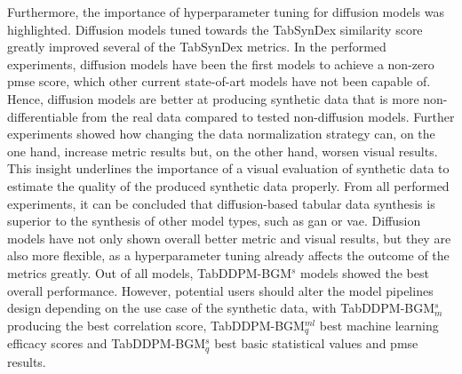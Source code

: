 Furthermore, the importance of hyperparameter tuning for diffusion models was highlighted.
Diffusion models tuned towards the TabSynDex similarity score greatly improved several of the TabSynDex metrics.
In the performed experiments, diffusion models have been the first models to achieve a non-zero \gls{pmse} score, which other current state-of-art models have not been capable of.
Hence, diffusion models are better at producing synthetic data that is more non-differentiable from the real data \cite{chundawat2022UniversalMetricRobust} compared to tested non-diffusion models.
Further experiments showed how changing the data normalization strategy can, on the one hand, increase metric results but, on the other hand, worsen visual results.
This insight underlines the importance of a visual evaluation of synthetic data to estimate the quality of the produced synthetic data properly.
From all performed experiments, it can be concluded that diffusion-based tabular data synthesis is superior to the synthesis of other model types, such as \gls{gan} or \gls{vae}.
Diffusion models have not only shown overall better metric and visual results, but they are also more flexible, as a hyperparameter tuning already affects the outcome of the metrics greatly.
Out of all models, TabDDPM-BGM$^{s}$ models showed the best overall performance.
However, potential users should alter the model pipelines design depending on the use case of the synthetic data, with TabDDPM-BGM$^{s}_m$ producing the best correlation score, TabDDPM-BGM$^{ml}_q$ best machine learning efficacy scores and TabDDPM-BGM$^{s}_q$ best basic statistical values and \gls{pmse} results.

